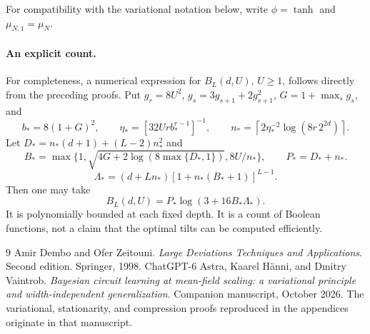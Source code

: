 \documentclass[11pt]{article}
\theoremstyle{remark}\newtheorem{remark}[theorem]{Remark}
\begin{document}
\appendix
For compatibility with the variational notation below, write $\phi=\tanh$ and $\mu_{N,1}=\mu_N$.






\paragraph{An explicit count.}
For completeness, a numerical expression for $B_L(d,U)$, $U\geq1$, follows
directly from the preceding proofs. Put $g_r=8U^2$,
$g_s=3g_{s+1}+2g_{s+1}^2$, $G=1+\max_s g_s$, and
\[
 b_*=8(1+G)^2,\qquad
 \eta_*=[32Ur b_*^{r-1}]^{-1},\qquad
 n_* =\left\lceil2\eta_*^{-2}\log(8r\,2^{2d})\right\rceil.
\]
Let $D_*=n_*(d+1)+(L-2)n_*^2$ and
\[
 B_* =\max\{1,\sqrt{4G+2\log(8\max\{D_*,1\})},8U/n_*\},
 \qquad P_*=D_*+n_*.
\]
\[
 \Lambda_*=(d+Ln_*)[1+n_*(B_*+1)]^{L-1}.
\]
Then one may take
\[
 B_L(d,U)=P_*\log(3+16B_*\Lambda_*).
\]
It is polynomially bounded at each fixed depth. It is a count of Boolean
functions, not a claim that the optimal tilts can be computed efficiently.

\begin{thebibliography}{9}
 Amir Dembo and Ofer Zeitouni.
\emph{Large Deviations Techniques and Applications}. Second edition.
Springer, 1998.
 ChatGPT-6 Astra, Kaarel H\"anni, and Dmitry Vaintrob.
\emph{Bayesian circuit learning at mean-field scaling: a variational principle
and width-independent generalization}. Companion manuscript, October 2026.
The variational, stationarity, and compression proofs reproduced in the
appendices originate in that manuscript.
\end{thebibliography}
\end{document}
